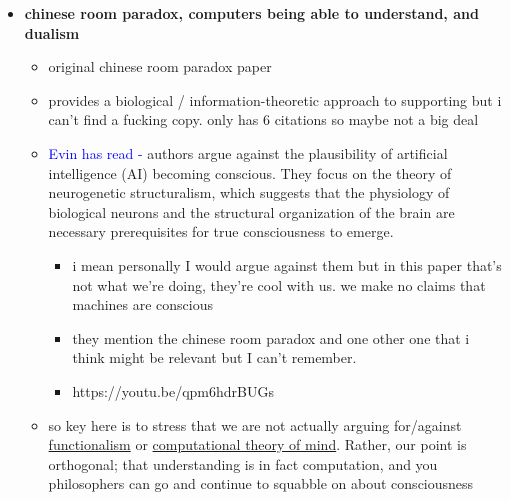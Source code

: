 \documentclass{article}
\begin{document}
\begin{itemize}
    \item \textbf{chinese room paradox, computers being able to understand, and dualism}
    \begin{itemize}
        \item original chinese room paradox paper \cite{searle}
        \item \cite{maleeh2015minds} provides a biological / information-theoretic approach to supporting \cite{searle1980minds} but i can't find a fucking copy. only has 6 citations so maybe not a big deal
        \item \textcolor{blue}{Evin has read -} \cite{walter2022problem} authors argue against the plausibility of artificial intelligence (AI) becoming conscious. They focus on the theory of neurogenetic structuralism, which suggests that the physiology of biological neurons and the structural organization of the brain are necessary prerequisites for true consciousness to emerge.
        \begin{itemize}
            \item i mean personally I would argue against them but in this paper that's not what we're doing, they're cool with us. we make no claims that machines are conscious
            \item they mention the chinese room paradox and one other one that i think might be relevant but I can't remember.
            \item https://youtu.be/qpm6hdrBUGs
        \end{itemize}
        \item so key here is to stress that we are not actually arguing for/against \href{https://en.wikipedia.org/wiki/Functionalism_(philosophy_of_mind)}{functionalism} or \href{https://en.wikipedia.org/wiki/Computational_theory_of_mind}{computational theory of mind}. Rather, our point is orthogonal; that understanding is in fact computation, and you philosophers can go and continue to squabble on about consciousness
    \end{itemize}
    

\end{itemize}
\end{document}
